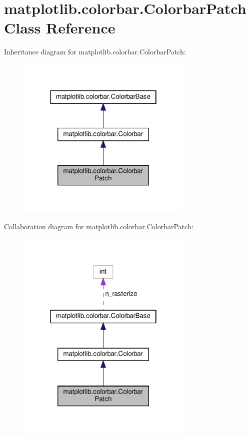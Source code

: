 \hypertarget{classmatplotlib_1_1colorbar_1_1ColorbarPatch}{}\section{matplotlib.\+colorbar.\+Colorbar\+Patch Class Reference}
\label{classmatplotlib_1_1colorbar_1_1ColorbarPatch}


Inheritance diagram for matplotlib.\+colorbar.\+Colorbar\+Patch\+:
\nopagebreak
\begin{figure}[H]
\begin{center}
\leavevmode
\includegraphics[width=238pt]{classmatplotlib_1_1colorbar_1_1ColorbarPatch__inherit__graph}
\end{center}
\end{figure}


Collaboration diagram for matplotlib.\+colorbar.\+Colorbar\+Patch\+:
\nopagebreak
\begin{figure}[H]
\begin{center}
\leavevmode
\includegraphics[width=238pt]{classmatplotlib_1_1colorbar_1_1ColorbarPatch__coll__graph}
\end{center}
\end{figure}
